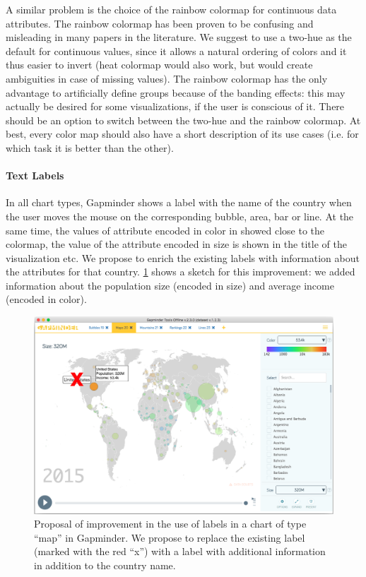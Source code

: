A similar problem is the choice of the rainbow colormap for continuous data attributes.
The rainbow colormap has been proven to be confusing and misleading \cite{color-maps} in many papers in the literature.
We suggest to use a two-hue as the default for continuous values, since it allows a natural ordering of colors and it thus easier to invert (heat colormap would also work, but would create ambiguities in case of missing values).
The rainbow colormap has the only advantage to artificially define groups because of the banding effects:
this may actually be desired for some visualizations, if the user is conscious of it.
There should be an option to switch between the two-hue and the rainbow colormap.
At best, every color map should also have a short description of its use cases (i.e. for which task it is better than the other).

\paragraph{Text Labels}
In all chart types, Gapminder shows a label with the name of the country when the user moves the mouse on the corresponding bubble, area, bar or line.
At the same time, the values of attribute encoded in color in showed close to the colormap, the value of the attribute encoded in size is shown in the title of the visualization etc.
We propose to enrich the existing labels with information about the attributes for that country.
\cref{fig:labels-custom} shows a sketch for this improvement:
we added information about the population size (encoded in size) and average income (encoded in color).

\begin{figure}[h]
	\centering
	\includegraphics[width=0.95\columnwidth]{figures/labels-custom}
	\caption{Proposal of improvement in the use of labels in a chart of type ``map'' in Gapminder. We propose to replace the existing label (marked with the red ``x'') with a label with additional information in addition to the country name.}
	\label{fig:labels-custom}
\end{figure}

